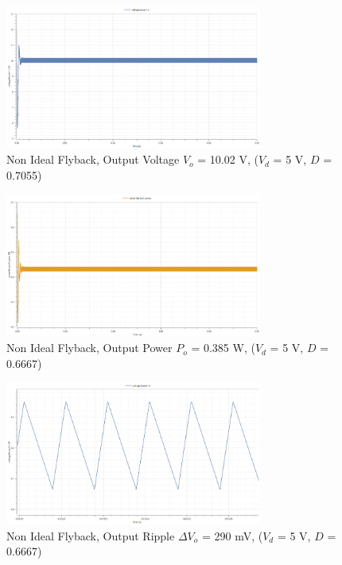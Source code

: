 \documentclass[12pt,twoside]{scrartcl}
\begin{document}
\begin{figure}[htp]
    \centering
    \includegraphics[width=0.75\textwidth]{NonIdealSim5V(tested).png}
    \caption{Non Ideal Flyback, Output Voltage $V_o$ = 10.02 V, ($V_d$ = 5 V, $D$ = 0.7055)}
    \label{fig:NonIdealSim5Vtested}
\end{figure}

\begin{figure}[htp]
    \centering
    \includegraphics[width=0.75\textwidth]{PowerNonIdealSim12V.png}
    \caption{Non Ideal Flyback, Output Power $P_o$ = 0.385 W, ($V_d$ = 5 V, $D$ = 0.6667)}
    \label{fig:PowerNonIdealSim5V}
\end{figure}

\begin{figure}[htp]
    \centering
    \includegraphics[width=0.75\textwidth]{RippleNonIdealSim5V.png}
    \caption{Non Ideal Flyback, Output Ripple $\Delta V_o$ = 290 mV, ($V_d$ = 5 V, $D$ = 0.6667)}
    \label{fig:RippleNonIdealSim5V}
\end{figure}
\newpage
\end{document}
